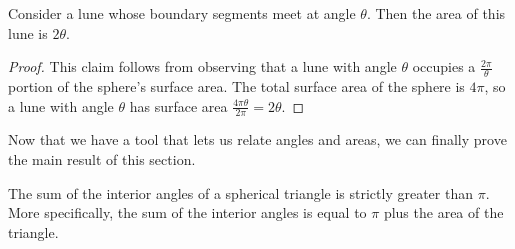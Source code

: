 \begin{claim}
	Consider a lune whose boundary segments meet at angle $\theta$.  Then the area of this lune is $2\theta$.
\end{claim}
\begin{proof}
This claim follows from observing that a lune with angle $\theta$ occupies a $\tfrac{2\pi}{\theta}$ portion of the sphere's surface area.  The total surface area of the sphere is $4\pi$, so a lune with angle $\theta$ has surface area $\tfrac{4\pi\theta}{2\pi}= 2\theta$.
\end{proof}

Now that we have a tool that lets us relate angles and areas, we can finally prove the main result of this section.






	



\begin{lemma}\label{lem:sphtri}
	
The sum of the interior angles of a spherical triangle is strictly greater than $\pi$.  More specifically, the sum of the interior angles is equal to $\pi$ plus the area of the triangle.
\end{lemma}

